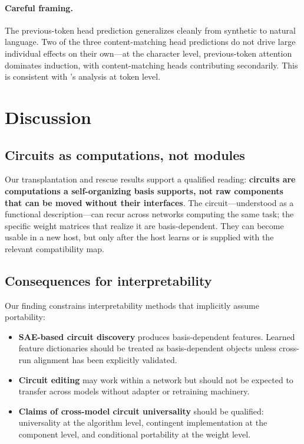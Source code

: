 \documentclass[final]{article}
\begin{document}
\paragraph{Careful framing.}
The previous-token head prediction generalizes cleanly from synthetic to natural
language. Two of the three content-matching head predictions do not drive large
individual effects on their own---at the character level, previous-token
attention dominates induction, with content-matching heads contributing
secondarily. This is consistent with \citet{olsson2022induction}'s analysis at
token level.

\section{Discussion}
\label{sec:discussion}

\subsection{Circuits as computations, not modules}

Our transplantation and rescue results support a qualified reading:
\textbf{circuits are computations a self-organizing basis supports, not raw
components that can be moved without their interfaces}. The circuit---understood
as a functional description---can recur across networks computing the same
task; the specific weight matrices that realize it are basis-dependent. They
can become usable in a new host, but only after the host learns or is supplied
with the relevant compatibility map.

\subsection{Consequences for interpretability}

Our finding constrains interpretability methods that implicitly assume
portability:
\begin{itemize}
\item \textbf{SAE-based circuit discovery} produces basis-dependent features.
      Learned feature dictionaries should be treated as basis-dependent objects
      unless cross-run alignment has been explicitly validated.
\item \textbf{Circuit editing} may work within a network but should not be
      expected to transfer across models without adapter or retraining
      machinery.
\item \textbf{Claims of cross-model circuit universality} should be qualified:
      universality at the algorithm level, contingent implementation at the
      component level, and conditional portability at the weight level.
\end{itemize}
\end{document}
